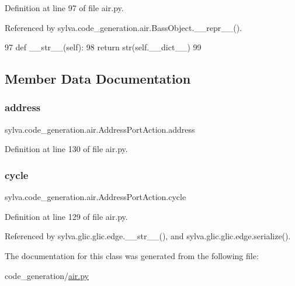 Definition at line 97 of file air.\+py.



Referenced by sylva.\+code\+\_\+generation.\+air.\+Bass\+Object.\+\_\+\+\_\+repr\+\_\+\+\_\+().


\begin{DoxyCode}
97     \textcolor{keyword}{def }\_\_str\_\_(self):
98         \textcolor{keywordflow}{return} str(self.\_\_dict\_\_)
99 
\end{DoxyCode}


\subsection{Member Data Documentation}
\mbox{\label{classsylva_1_1code__generation_1_1air_1_1_address_port_action_a6a2ed473ad0902a5fb0128e61b42c988}} 
\subsubsection{\texorpdfstring{address}{address}}
{\footnotesize\ttfamily sylva.\+code\+\_\+generation.\+air.\+Address\+Port\+Action.\+address}



Definition at line 130 of file air.\+py.

\mbox{\label{classsylva_1_1code__generation_1_1air_1_1_address_port_action_aa6bd7cd1cbf6cf3a36e02329a88affbf}} 
\subsubsection{\texorpdfstring{cycle}{cycle}}
{\footnotesize\ttfamily sylva.\+code\+\_\+generation.\+air.\+Address\+Port\+Action.\+cycle}



Definition at line 129 of file air.\+py.



Referenced by sylva.\+glic.\+glic.\+edge.\+\_\+\+\_\+str\+\_\+\+\_\+(), and sylva.\+glic.\+glic.\+edge.\+serialize().



The documentation for this class was generated from the following file\+:\begin{DoxyCompactItemize}
\item 
code\+\_\+generation/\hyperlink{air_8py}{air.\+py}\end{DoxyCompactItemize}
